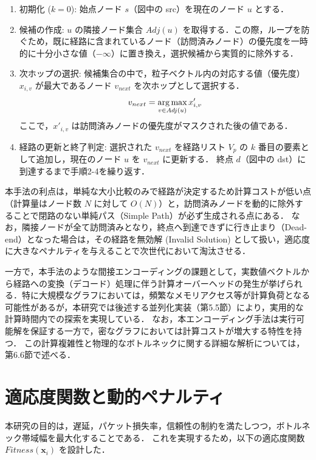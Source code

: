 \begin{enumerate}
  \item 初期化 ($k=0$): 始点ノード $s$（図中の src）を現在のノード $u$ とする．
  \item 候補の作成: $u$ の隣接ノード集合 $Adj(u)$ を取得する．この際，ループを防ぐため，既に経路に含まれているノード（訪問済みノード）の優先度を一時的に十分小さな値（$-\infty$）に置き換え，選択候補から実質的に除外する．
  \item 次ホップの選択: 候補集合の中で，粒子ベクトル内の対応する値（優先度） $x_{i,v}$ が最大であるノード $v_{next}$ を次ホップとして選択する．
  \begin{equation}
    v_{next} = \operatorname*{arg\,max}_{v \in Adj(u)} x'_{i,v}
  \end{equation}
  ここで，$x'_{i,v}$ は訪問済みノードの優先度がマスクされた後の値である．
  
  \item 経路の更新と終了判定: 選択された $v_{next}$ を経路リスト $V_p$ の $k$ 番目の要素として追加し，現在のノード $u$ を $v_{next}$ に更新する．
  終点 $d$（図中の dst）に到達するまで手順2-4を繰り返す．
\end{enumerate}

本手法の利点は，単純な大小比較のみで経路が決定するため計算コストが低い点（計算量はノード数 $N$ に対して $O(N)$）と，訪問済みノードを動的に除外することで閉路のない単純パス（Simple Path）が必ず生成される点にある．
なお，隣接ノードが全て訪問済みとなり，終点へ到達できずに行き止まり（Dead-end）となった場合は，その経路を無効解 (Invalid Solution) として扱い，適応度に大きなペナルティを与えることで次世代において淘汰させる．

一方で，本手法のような間接エンコーディングの課題として，実数値ベクトルから経路への変換（デコード）処理に伴う計算オーバーヘッドの発生が挙げられる．特に大規模なグラフにおいては，頻繁なメモリアクセス等が計算負荷となる可能性があるが，本研究では後述する並列化実装（第5.5節）により，実用的な計算時間内での探索を実現している．
なお，本エンコーディング手法は実行可能解を保証する一方で，密なグラフにおいては計算コストが増大する特性を持つ．
この計算複雑性と物理的なボトルネックに関する詳細な解析については，第6.6節で述べる．
\section{適応度関数と動的ペナルティ}
本研究の目的は，遅延，パケット損失率，信頼性の制約を満たしつつ，ボトルネック帯域幅を最大化することである．
これを実現するため，以下の適応度関数 $Fitness(\boldsymbol{x}_i)$ を設計した．

